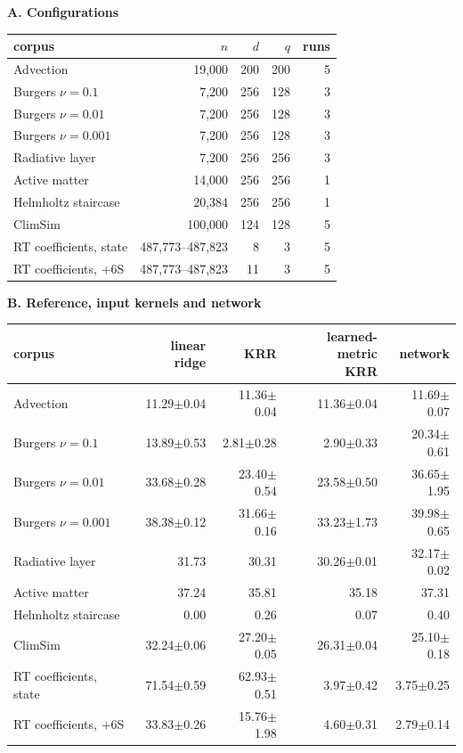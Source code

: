 \textbf{A. Configurations}\par\medskip
{\fontsize{9}{11}\selectfont
\setlength{\tabcolsep}{4pt}
\begin{tabular}{lrrrr}
\toprule
corpus & $n$ & $d$ & $q$ & runs \\
\midrule
Advection & 19,000 & 200 & 200 & 5 \\
Burgers $\nu=0.1$ & 7,200 & 256 & 128 & 3 \\
Burgers $\nu=0.01$ & 7,200 & 256 & 128 & 3 \\
Burgers $\nu=0.001$ & 7,200 & 256 & 128 & 3 \\
Radiative layer & 7,200 & 256 & 256 & 3 \\
Active matter & 14,000 & 256 & 256 & 1 \\
Helmholtz staircase & 20,384 & 256 & 256 & 1 \\
ClimSim & 100,000 & 124 & 128 & 5 \\
RT coefficients, state & 487,773--487,823 & 8 & 3 & 5 \\
RT coefficients, +6S & 487,773--487,823 & 11 & 3 & 5 \\
\bottomrule
\end{tabular}}
\par\medskip\textbf{B. Reference, input kernels and network}\par\medskip
{\fontsize{9}{11}\selectfont
\setlength{\tabcolsep}{3pt}
\begin{tabular}{lrrrr}
\toprule
corpus & linear ridge & KRR & \thead{learned-metric\\KRR} & network \\
\midrule
Advection & 11.29$\pm$0.04 & 11.36$\pm$0.04 & 11.36$\pm$0.04 & 11.69$\pm$0.07 \\
Burgers $\nu=0.1$ & 13.89$\pm$0.53 & 2.81$\pm$0.28 & 2.90$\pm$0.33 & 20.34$\pm$0.61 \\
Burgers $\nu=0.01$ & 33.68$\pm$0.28 & 23.40$\pm$0.54 & 23.58$\pm$0.50 & 36.65$\pm$1.95 \\
Burgers $\nu=0.001$ & 38.38$\pm$0.12 & 31.66$\pm$0.16 & 33.23$\pm$1.73 & 39.98$\pm$0.65 \\
Radiative layer & 31.73 & 30.31 & 30.26$\pm$0.01 & 32.17$\pm$0.02 \\
Active matter & 37.24 & 35.81 & 35.18 & 37.31 \\
Helmholtz staircase & 0.00 & 0.26 & 0.07 & 0.40 \\
ClimSim & 32.24$\pm$0.06 & 27.20$\pm$0.05 & 26.31$\pm$0.04 & 25.10$\pm$0.18 \\
RT coefficients, state & 71.54$\pm$0.59 & 62.93$\pm$0.51 & 3.97$\pm$0.42 & 3.75$\pm$0.25 \\
RT coefficients, +6S & 33.83$\pm$0.26 & 15.76$\pm$1.98 & 4.60$\pm$0.31 & 2.79$\pm$0.14 \\
\bottomrule
\end{tabular}}
